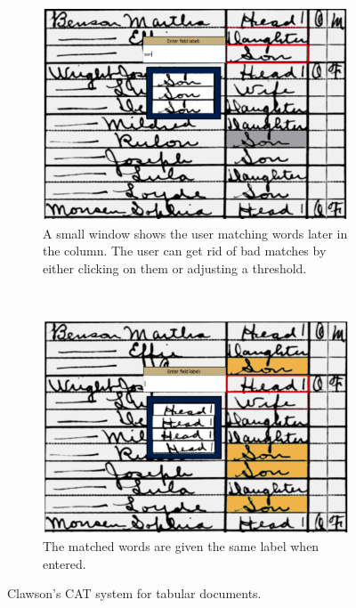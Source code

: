\documentclass[ms]{byuprop}
\begin{document}
\begin{figure}[h]
    \centering
    \begin{subfigure}[t]{0.46\textwidth}
    		\centering
    		\includegraphics[width=\textwidth]{ii_ex_a}
    		\caption{A small window shows the user matching words later in the column. The user can get rid of bad matches by either clicking on them or adjusting a  threshold.}
    	\end{subfigure}
    	~
    	\begin{subfigure}[t]{0.46\textwidth}
    		\centering
    		\includegraphics[width=\textwidth]{ii_ex_b}
    		\caption{The matched words are given the same label when entered.}
    	\end{subfigure}
    	\caption{Clawson's CAT system for tabular documents.}
    	\label{fig:ii}
\end{figure}
\end{document}

